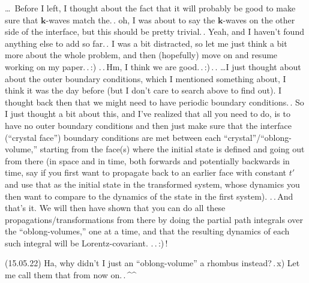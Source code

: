 \documentclass{report}
\begin{document}
\ldots\ Before I left, I thought about the fact that it will probably be good to make sure that $\boldsymbol{k}$-waves match the.\,. oh, I was about to say the $\boldsymbol{k}$-waves on the other side of the interface, but this should be pretty trivial.\,. Yeah, and I haven't found anything else to add so far.\,. I was a bit distracted, so let me just think a bit more about the whole problem, and then (hopefully) move on and resume working on my paper.\,.\,:) .\,.\,Hm, I think we are good.\,.\,:)\,.\,. \ldots I just thought about about the outer boundary conditions, which I mentioned something about, I think it was the day before (but I don't care to search above to find out). I thought back then that we might need to have periodic boundary conditions.\,. So I just thought a bit about this, and I've realized that all you need to do, is to have no outer boundary conditions and then just make sure that the interface (``crystal face'') boundary conditions are met between each ``crystal''/``oblong-volume,'' starting from the face(s) where the initial state is defined and going out from there (in space and in time, both forwards and potentially backwards in time, say if you first want to propagate back to an earlier face with constant $t'$ and use that as the initial state in the transformed system, whose dynamics you then want to compare to the dynamics of the state in the first system). .\,.\,And that's it. We will then have shown that you can do all these propagations/transformations from there by doing the partial path integrals over the ``oblong-volumes,'' one at a time, and that the resulting dynamics of each such integral will be Lorentz-covariant. .\,.\,:)\,! 

(15.05.22) Ha, why didn't I just an ``oblong-volume'' a rhombus instead?\,.\,x) Let me call them that from now on.\,.\,\textasciicircum\textasciicircum\ 
\end{document}
